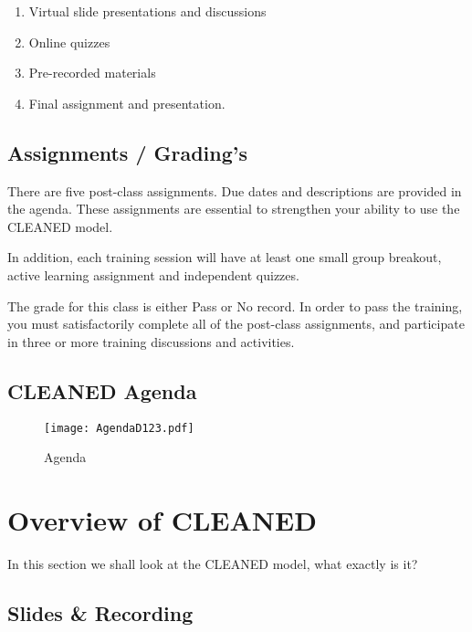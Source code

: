 \documentclass[
]{book}
\providecommand{\tightlist}{%
  \setlength{\itemsep}{0pt}\setlength{\parskip}{0pt}}
\begin{document}
\begin{enumerate}
\def\labelenumi{\arabic{enumi}.}
\tightlist
\item
  Virtual slide presentations and discussions
\item
  Online quizzes
\item
  Pre-recorded materials
\item
  Final assignment and presentation.
\end{enumerate}

\hypertarget{assignments-gradings}{%
\section{Assignments / Grading's}\label{assignments-gradings}}

There are five post-class assignments. Due dates and descriptions are provided in the agenda. These assignments are essential to strengthen your ability to use the CLEANED model.

In addition, each training session will have at least one small group breakout, active learning assignment and independent quizzes.

The grade for this class is either Pass or No record. In order to pass the training, you must satisfactorily complete all of the post-class assignments, and participate in three or more training discussions and activities.

\hypertarget{cleaned-agenda}{%
\section{CLEANED Agenda}\label{cleaned-agenda}}

\begin{figure}
\centering
\texttt{[image: AgendaD123.pdf]}
\caption{Agenda}
\end{figure}

\hypertarget{overview-of-cleaned}{%
\chapter{Overview of CLEANED}\label{overview-of-cleaned}}

In this section we shall look at the CLEANED model, what exactly is it?

\hypertarget{slides-recording}{%
\section{Slides \& Recording}\label{slides-recording}}
\end{document}
